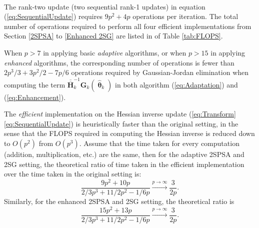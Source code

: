 \documentclass[conference,10.6cpt]{IEEEtran}
\newcommand{\bG}{\bm{G}}
\newcommand{\ooH}{\bm{\overline{\overline{H}}}}
\newcommand{\htheta}{\bm{\hat{\uptheta}}}
\begin{document}
\begin{table} [!hbp] \centering 
	\\[5pt]
		\caption{FLOPS Required in Eq. (\ref{eq:Transform}\text{--}\ref{eq:SequentialUpdate})  }
		\label{tab:FLOPS}
	\end{table}

The rank-two update (two sequential rank-1 updates) in
equation (\ref{eq:SequentialUpdate}) requires $9p^2 + 4p$ operations
per iteration. The total number of operations required to perform all four
efficient implementations from Section \ref{2SPSA} to \ref{Enhanced
  2SG} are listed in of Table \ref{tab:FLOPS}.

When $p>7$ in
applying basic \textit{adaptive} algorithms, or when $p>15$ in applying \textit{enhanced} algorithms, the corresponding number
of operations is fewer than $2p^3/3+3p^2/2-7p/6$ operations required
by Gaussian-Jordan elimination when computing the term $\ooH_k^{-1}
\bG_k(\htheta_k)$ in both algorithm (\ref{eq:Adaptation}) and
(\ref{eq:Enhancement}).

The \textit{efficient} implementation on the Hessian inverse update (\ref{eq:Transform}\text{--}\ref{eq:SequentialUpdate}) is heuristically faster than the original setting, in the sense that the FLOPS required in computing the Hessian inverse is reduced down to $O(p^2)$ from $O(p^3)$. Assume that the time taken for every computation (addition, multiplication, etc.) are the same, then for the adaptive 2SPSA and 2SG setting, the theoretical ratio of time taken in the efficient implementation over the time taken in the original setting is:
\begin{equation*}
\frac{9p^2+10p}{2/3p^3+11/2p^2-1/6p} \overset{p \to \infty}{\longrightarrow} \frac{3}{2p}.
\end{equation*}
Similarly, for the enhanced 2SPSA and 2SG setting, the theoretical ratio is
\begin{equation*}
\frac{15p^2+13p}{2/3p^3+11/2p^2-1/6p} \overset{p \to \infty}{\longrightarrow} \frac{3}{2p}.
\end{equation*}
\end{document}
